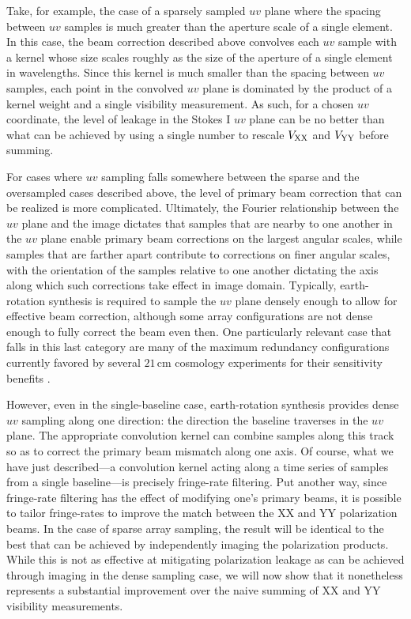 \documentclass[twocolumn,apj,numberedappendix]{emulateapj}
\begin{document}
Take, for example, the case of a sparsely sampled $uv$ plane where the spacing between $uv$ samples is much greater than
the aperture scale of a single element.  In this case, the beam correction described above 
convolves each $uv$ sample with a kernel whose size scales roughly as the size of the aperture of a
single element in wavelengths.  Since this kernel is much smaller than the spacing between $uv$ samples, 
each point in the convolved $uv$ plane is dominated by the product of a kernel weight and a single visibility measurement.
As such, for a chosen $uv$ coordinate, the level of leakage in the Stokes I $uv$ plane can
be no better than what can be achieved by using a single number to rescale ${V_{\rm XX}}$ and ${V_{\rm YY}}$ before summing.  

For cases where $uv$ sampling falls somewhere between the sparse and the oversampled cases described above, the level
of primary beam correction that can be realized is more complicated.  Ultimately, the Fourier relationship between
the $uv$ plane and the image dictates that samples that are nearby to one
another in the $uv$ plane enable primary beam corrections on the largest angular scales, while samples that are farther
apart contribute to corrections on finer angular scales, with the orientation of the samples relative to one another
dictating the axis along which such corrections take effect in image domain.  Typically, earth-rotation synthesis
is required to sample the $uv$ plane densely enough to allow for effective beam correction, although some array
configurations are not dense enough to fully correct the beam even then.  One particularly relevant case that falls
in this last category are many of the maximum redundancy configurations currently favored by several $21\,\textrm{cm}$ cosmology experiments
for their sensitivity benefits \citep{parsons_et_al2012a,P14}.

However, even in the single-baseline case, earth-rotation synthesis provides dense $uv$ sampling along one direction: the
direction the baseline traverses in the $uv$ plane.  The appropriate
convolution kernel can combine samples along this track so as to correct the primary beam mismatch along one axis.
Of course, what we have just described---a convolution kernel acting along a time series
of samples from a single baseline---is precisely fringe-rate filtering.  Put another way, since fringe-rate filtering has the effect of modifying one's primary beams, it is possible to tailor fringe-rates to improve the match between the XX and YY polarization beams. In the case of sparse array sampling, the result will be identical to the best that can be achieved by independently
imaging the polarization products.  While this is not as effective at mitigating polarization leakage as can be achieved
through imaging in the dense sampling case, we will now show that it nonetheless represents a substantial improvement
over the naive summing of XX and YY visibility measurements.
\end{document}
